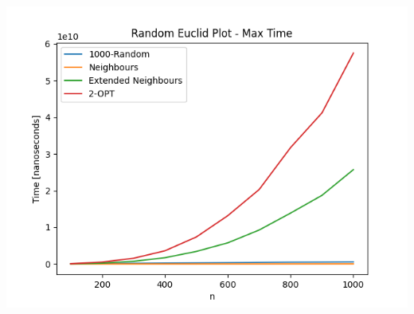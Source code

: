 \documentclass{article}
\begin{document}
\begin{center}
\includegraphics[width=\textwidth, 
                   height = 0.4\textheight, 
                   keepaspectratio]
                  {generated_euclid_max_time} 
\end{center}
\end{document}
